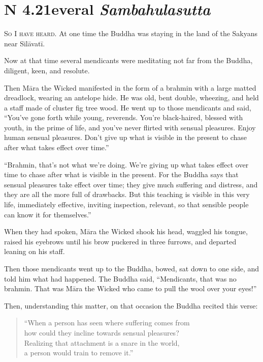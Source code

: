 \documentclass[12pt,openany]{book}%
\newcommand*{\suttatitleacronym}[1]{\smaller[2]{#1}\vspace*{.3em}}
\newcommand*{\suttatitletranslation}[1]{\linebreak{#1}}
\newcommand*{\suttatitleroot}[1]{\linebreak\smaller[2]\itshape{#1}}
\newcommand*{\tocacronym}[1]{\hspace*{-3.3em}{#1}\quad}
\newcommand*{\toctranslation}[1]{#1}
\newcommand*{\tocroot}[1]{(\textit{#1})}
\newcommand*{\scevam}[1]{\textsc{#1}}
\begin{document}
%
\section*{{\suttatitleacronym SN 4.21}{\suttatitletranslation Several }{\suttatitleroot Sambahulasutta}}
\addcontentsline{toc}{section}{\tocacronym{SN 4.21} \toctranslation{Several } \tocroot{Sambahulasutta}}

\scevam{So I have heard. }At one time the Buddha was staying in the land of the Sakyans near \textsanskrit{Silāvatī}. 

Now at that time several mendicants were meditating not far from the Buddha, diligent, keen, and resolute. 

Then \textsanskrit{Māra} the Wicked manifested in the form of a brahmin with a large matted dreadlock, wearing an antelope hide. He was old, bent double, wheezing, and held a staff made of cluster fig tree wood. He went up to those mendicants and said, “You’ve gone forth while young, reverends. You’re black-haired, blessed with youth, in the prime of life, and you’ve never flirted with sensual pleasures. Enjoy human sensual pleasures. Don’t give up what is visible in the present to chase after what takes effect over time.” 

“Brahmin, that’s not what we’re doing. We’re giving up what takes effect over time to chase after what is visible in the present. For the Buddha says that sensual pleasures take effect over time; they give much suffering and distress, and they are all the more full of drawbacks. But this teaching is visible in this very life, immediately effective, inviting inspection, relevant, so that sensible people can know it for themselves.” 

When they had spoken, \textsanskrit{Māra} the Wicked shook his head, waggled his tongue, raised his eyebrows until his brow puckered in three furrows, and departed leaning on his staff. 

Then those mendicants went up to the Buddha, bowed, sat down to one side, and told him what had happened. The Buddha said, “Mendicants, that was no brahmin. That was \textsanskrit{Māra} the Wicked who came to pull the wool over your eyes!” 

Then, understanding this matter, on that occasion the Buddha recited this verse: 

\begin{verse}%
“When a person has seen where suffering comes from \\
how could they incline towards sensual pleasures? \\
Realizing that attachment is a snare in the world, \\
a person would train to remove it.” 

%
\end{verse}
\end{document}
